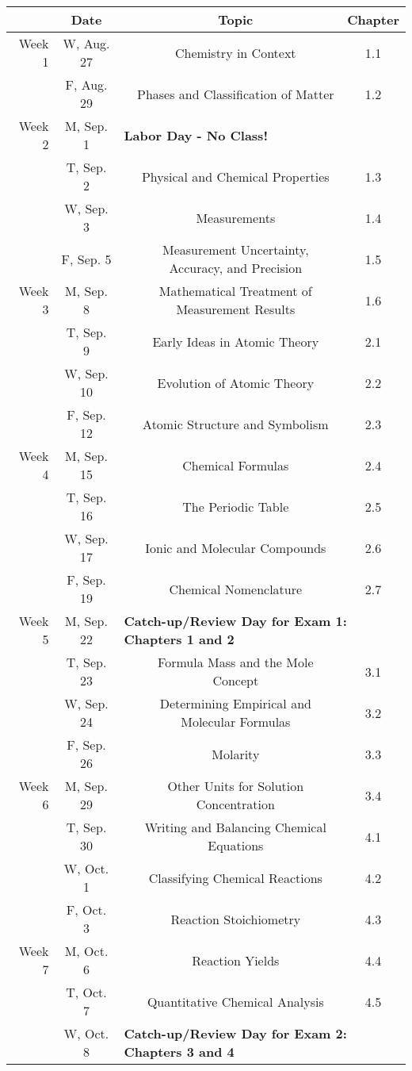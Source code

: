 \begin{tabular}{rcccc}
& Date && Topic & Chapter\\
\midrule
Week 1 & W, Aug. 27&& Chemistry in Context & 1.1\\
& F, Aug. 29&& Phases and Classification of Matter & 1.2\\
\midrule
Week 2 & M, Sep. 1& \multicolumn{3}{l}{\textbf{Labor Day - No Class!}}\\
& T, Sep. 2&& Physical and Chemical Properties & 1.3\\
& W, Sep. 3&& Measurements & 1.4\\
& F, Sep. 5&& Measurement Uncertainty, Accuracy, and Precision & 1.5\\
\midrule
Week 3 & M, Sep. 8&& Mathematical Treatment of Measurement Results & 1.6\\
& T, Sep. 9&& Early Ideas in Atomic Theory & 2.1\\
& W, Sep. 10&& Evolution of Atomic Theory & 2.2\\
& F, Sep. 12&& Atomic Structure and Symbolism & 2.3\\
\midrule
Week 4 & M, Sep. 15&& Chemical Formulas & 2.4\\
& T, Sep. 16&& The Periodic Table & 2.5\\
& W, Sep. 17&& Ionic and Molecular Compounds & 2.6\\
& F, Sep. 19&& Chemical Nomenclature & 2.7\\
\midrule
Week 5 & M, Sep. 22& \multicolumn{3}{l}{\textbf{Catch-up/Review Day for Exam 1: Chapters 1 and 2}}\\
& T, Sep. 23&& Formula Mass and the Mole Concept & 3.1\\
& W, Sep. 24&& Determining Empirical and Molecular Formulas & 3.2\\
& F, Sep. 26&& Molarity & 3.3\\
\midrule
Week 6 & M, Sep. 29&& Other Units for Solution Concentration & 3.4\\
& T, Sep. 30&& Writing and Balancing Chemical Equations & 4.1\\
& W, Oct. 1&& Classifying Chemical Reactions & 4.2\\
& F, Oct. 3&& Reaction Stoichiometry & 4.3\\
\midrule
Week 7 & M, Oct. 6&& Reaction Yields & 4.4\\
& T, Oct. 7&& Quantitative Chemical Analysis & 4.5\\
& W, Oct. 8& \multicolumn{3}{l}{\textbf{Catch-up/Review Day for Exam 2: Chapters 3 and 4}}\\

\end{tabular}
